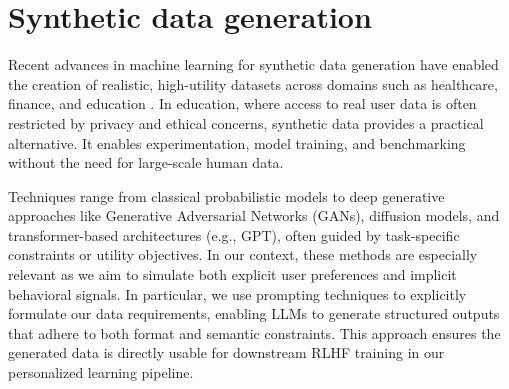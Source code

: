 \section{Synthetic data generation} 
Recent advances in machine learning for synthetic data generation have enabled the creation of realistic, high-utility datasets across domains such as healthcare, finance, and education \cite{lu2025machinelearningsyntheticdata}. In education, where access to real user data is often restricted by privacy and ethical concerns, synthetic data provides a practical alternative. It enables experimentation, model training, and benchmarking without the need for large-scale human data. 

Techniques range from classical probabilistic models to deep generative approaches like Generative Adversarial Networks (GANs), diffusion models, and transformer-based architectures (e.g., GPT), often guided by task-specific constraints or utility objectives. In our context, these methods are especially relevant as we aim to simulate both explicit user preferences and implicit behavioral signals. In particular, we use prompting techniques \cite{sahoo2025systematicsurveypromptengineering} to explicitly formulate our data requirements, enabling LLMs to generate structured outputs that adhere to both format and semantic constraints. This approach ensures the generated data is directly usable for downstream RLHF training in our personalized learning pipeline.